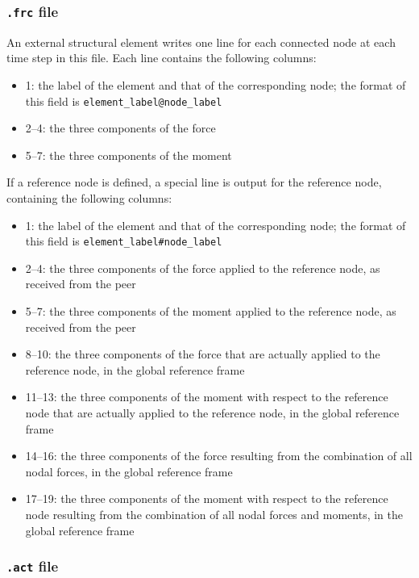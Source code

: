 \subsubsection{\texttt{.frc} file}

An external structural element writes one line for each connected node at each time step in this file. Each line contains the following columns:

\begin{itemize}
    \item 1: the label of the element and that of the corresponding node; the format of this field is \texttt{element\_label@node\_label}
    \item 2–4: the three components of the force
    \item 5–7: the three components of the moment
\end{itemize}

If a reference node is defined, a special line is output for the reference node, containing the following columns:

\begin{itemize}
    \item 1: the label of the element and that of the corresponding node; the format of this field is \texttt{element\_label\#node\_label}
    \item 2–4: the three components of the force applied to the reference node, as received from the peer
    \item 5–7: the three components of the moment applied to the reference node, as received from the peer
    \item 8–10: the three components of the force that are actually applied to the reference node, in the global reference frame
    \item 11–13: the three components of the moment with respect to the reference node that are actually applied to the reference node, in the global reference frame
    \item  14–16: the three components of the force resulting from the combination of all nodal forces, in the global reference frame
    \item 17–19: the three components of the moment with respect to the reference node resulting from the combination of all nodal forces and moments, in the global reference frame
    
\end{itemize}


\subsubsection{\texttt{.act} file}

